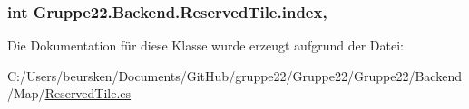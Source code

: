\hypertarget{class_gruppe22_1_1_backend_1_1_reserved_tile_a2f29d3692af2bcd57de9c4e258412d5c}{
\subsubsection[{index}]{\setlength{\rightskip}{0pt plus 5cm}int Gruppe22.\-Backend.\-Reserved\-Tile.\-index\hspace{0.3cm}{\ttfamily [get]}, {\ttfamily [set]}}}\label{class_gruppe22_1_1_backend_1_1_reserved_tile_a2f29d3692af2bcd57de9c4e258412d5c}


Die Dokumentation für diese Klasse wurde erzeugt aufgrund der Datei\-:\begin{DoxyCompactItemize}
\item 
C\-:/\-Users/beursken/\-Documents/\-Git\-Hub/gruppe22/\-Gruppe22/\-Gruppe22/\-Backend/\-Map/\hyperlink{_reserved_tile_8cs}{Reserved\-Tile.\-cs}\end{DoxyCompactItemize}
